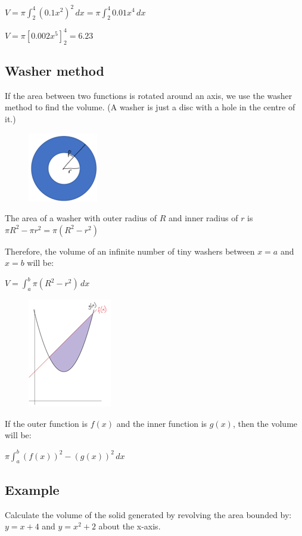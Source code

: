 \documentclass[../main.tex]{subfiles}
\begin{document}
$V=\pi \int_2^4 (0.1x^2)^2\,dx = \pi \int_2^4 0.01x^4\,dx$

$V=\pi[0.002x^5]_2^4=6.23$

\subsection*{Washer method}
If the area between two functions is rotated around an axis, we use the washer method to find the volume. (A washer is just a disc with a hole in the centre of it.)

\begin{figure}[h]
    \centering
    \includegraphics{images/volrev5.png}
\end{figure}

The area of a washer with outer radius of $R$ and inner radius of $r$ is $\pi R^2-\pi r^2=\pi(R^2 - r^2)$

Therefore, the volume of an infinite number of tiny washers between $x=a$ and $x=b$ will be:

$V=\int_a^b \pi (R^2 - r^2)\,dx$

\begin{figure}[h]
    \centering
    \includegraphics{images/volrev6.png}
\end{figure}

If the outer function is $f(x)$ and the inner function is $g(x)$, then the volume will be:

$\pi \int_a^b (f(x))^2 - (g(x))^2\,dx$
\pagebreak
\subsection*{Example}
Calculate the volume of the solid generated by revolving the area bounded by:
 $y=x+4$ and $y=x^2+2$ about the x-axis.
\end{document}
